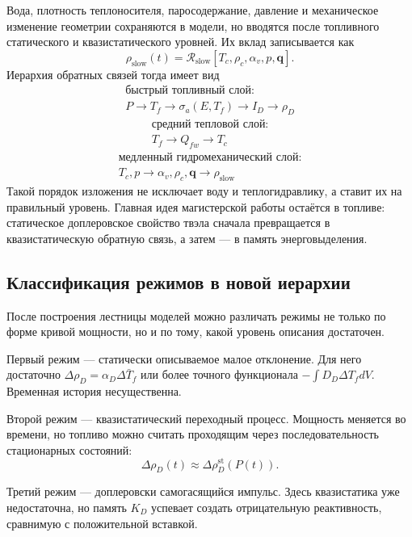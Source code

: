 \documentclass[12pt]{article}
\begin{document}
Вода, плотность теплоносителя, паросодержание, давление и механическое изменение геометрии сохраняются в модели, но вводятся после топливного статического и квазистатического уровней. Их вклад записывается как
\[
\rho_{\mathrm{slow}}(t)
=
\mathcal R_{\mathrm{slow}}
[T_c,\rho_c,\alpha_v,p,\mathbf q].
\]
Иерархия обратных связей тогда имеет вид
\[
\boxed{
\begin{gathered}
\text{быстрый топливный слой:}\\
P\rightarrow T_f\rightarrow\sigma_a(E,T_f)\rightarrow I_D\rightarrow\rho_D
\end{gathered}
}
\]
\[
\boxed{
\begin{gathered}
\text{средний тепловой слой:}\\
T_f\rightarrow Q_{fw}\rightarrow T_c
\end{gathered}
}
\]
\[
\boxed{
\begin{gathered}
\text{медленный гидромеханический слой:}\\
T_c,p\rightarrow \alpha_v,\rho_c,\mathbf q\rightarrow \rho_{\mathrm{slow}}
\end{gathered}
}
\]
Такой порядок изложения не исключает воду и теплогидравлику, а ставит их на правильный уровень. Главная идея магистерской работы остаётся в топливе: статическое доплеровское свойство твэла сначала превращается в квазистатическую обратную связь, а затем --- в память энерговыделения.

\subsection{Классификация режимов в новой иерархии}

После построения лестницы моделей можно различать режимы не только по форме кривой мощности, но и по тому, какой уровень описания достаточен.

Первый режим --- статически описываемое малое отклонение. Для него достаточно \(\Delta\rho_D=\alpha_D\Delta\bar T_f\) или более точного функционала \(-\int D_D\Delta T_fdV\). Временная история несущественна.

Второй режим --- квазистатический переходный процесс. Мощность меняется во времени, но топливо можно считать проходящим через последовательность стационарных состояний:
\[
\Delta\rho_D(t)\approx\Delta\rho_D^{\mathrm{st}}(P(t)).
\]

Третий режим --- доплеровски самогасящийся импульс. Здесь квазистатика уже недостаточна, но память \(K_D\) успевает создать отрицательную реактивность, сравнимую с положительной вставкой.
\end{document}

